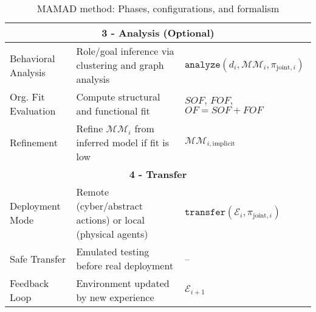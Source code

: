 \begin{table}[h!]
\begin{tabular}{|l|p{8cm}|p{3.5cm}|}
        \multicolumn{3}{|c|}{\textbf{3 - Analysis (Optional)}} \\ \hline
        Behavioral Analysis & Role/goal inference via clustering and graph analysis & $\texttt{analyze}(d_i, \mathcal{MM}_i, \pi_{\text{joint}, i})$ \\ \hline
        Org. Fit Evaluation & Compute structural and functional fit & $SOF$, $FOF$, $OF = SOF + FOF$ \\ \hline
        Refinement & Refine $\mathcal{MM}_i$ from inferred model if fit is low & $\mathcal{MM}_{i, \text{implicit}}$ \\ \hline

        \multicolumn{3}{|c|}{\textbf{4 - Transfer}} \\ \hline
        Deployment Mode & Remote (cyber/abstract actions) or local (physical agents) & $\texttt{transfer}(\mathcal{E}_i, \pi_{\text{joint}, i})$ \\ \hline
        Safe Transfer & Emulated testing before real deployment & -- \\ \hline
        Feedback Loop & Environment updated by new experience & $\mathcal{E}_{i+1}$ \\ \hline
    \end{tabular}
    \caption{MAMAD method: Phases, configurations, and formalism}
    \label{tab:mamad_table_configuration}
\end{table}

